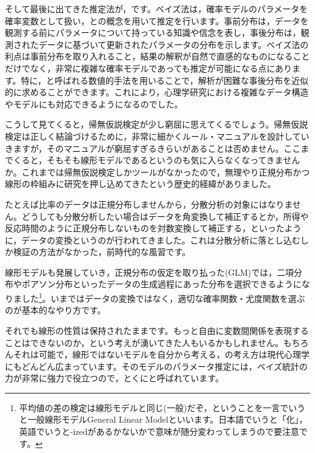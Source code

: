 \documentclass{ltjbook}
\begin{document}
そして最後に出てきた推定法が，です。ベイズ法は，確率モデルのパラメータを確率変数として扱い，との概念を用いて推定を行います。事前分布は，データを観測する前にパラメータについて持っている知識や信念を表し，事後分布は，観測されたデータに基づいて更新されたパラメータの分布を示します。ベイズ法の利点は事前分布を取り入れること，結果の解釈が自然で直感的なものになることだけでなく，非常に複雑な確率モデルであっても推定が可能になる点にあります。特に，と呼ばれる数値的手法を用いることで，解析が困難な事後分布を近似的に求めることができます。これにより，心理学研究における複雑なデータ構造やモデルにも対応できるようになるのでした。

こうして見てくると，帰無仮説検定が少し窮屈に思えてくるでしょう。帰無仮説検定は正しく結論づけるために，非常に細かくルール・マニュアルを設計していきますが，そのマニュアルが窮屈すぎるきらいがあることは否めません。ここまでくると，そもそも線形モデルであるというのも気に入らなくなってきませんか。これまでは帰無仮説検定しかツールがなかったので，無理やり正規分布かつ線形の枠組みに研究を押し込めてきたという歴史的経緯がありました。

たとえば比率のデータは正規分布しませんから，分散分析の対象にはなりません。どうしても分散分析したい場合はデータを角変換して補正するとか，所得や反応時間のように正規分布しないものを対数変換して補正する，といったように，データの変換というのが行われてきました。これは分散分析に落とし込むしか検証の方法がなかった，前時代的な風習です。

線形モデルも発展していき，正規分布の仮定を取り払った(GLM)では，二項分布やポアソン分布といったデータの生成過程にあった分布を選択できるようになりました\footnote{平均値の差の検定は線形モデルと同じ(一般)だぞ，ということを一言でいうと一般線形モデルGeneral Linear Modelといいます。日本語でいうと「化」，英語でいうと-izedがあるかないかで意味が随分変わってしまうので要注意です。}。いまではデータの変換ではなく，適切な確率関数・尤度関数を選ぶのが基本的なやり方です。

それでも線形の性質は保持されたままです。もっと自由に変数間関係を表現することはできないのか，という考えが湧いてきた人もいるかもしれません。もちろんそれは可能で，線形ではないモデルを自分から考える，の考え方は現代心理学にもどんどん広まっています。そのモデルのパラメータ推定には，ベイズ統計の力が非常に強力で役立つので，とくにと呼ばれています。
\end{document}
